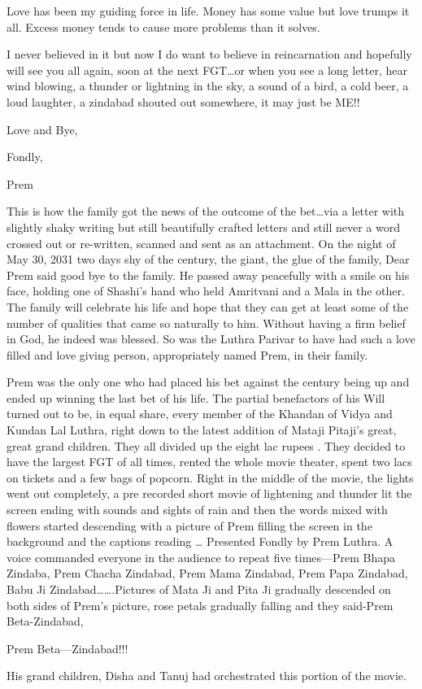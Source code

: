 Love has been my guiding force in life. Money has some value but love
trumps it all. Excess money tends to cause more problems than it solves.

I never believed in it but now I do want to believe in reincarnation and
hopefully will see you all again, soon at the next FGT\ldots{}or when
you see a long letter, hear wind blowing, a thunder or lightning in the
sky, a sound of a bird, a cold beer, a loud laughter, a zindabad shouted
out somewhere, it may just be ME!!

Love and Bye,

Fondly,

Prem

This is how the family got the news of the outcome of the bet\ldots{}via
a letter with slightly shaky writing but still beautifully crafted
letters and still never a word crossed out or re-written, scanned and
sent as an attachment. On the night of May 30, 2031 two days shy of the
century, the giant, the glue of the family, Dear Prem said good bye to
the family. He passed away peacefully with a smile on his face, holding
one of Shashi's hand who held Amritvani and a Mala in the other. The
family will celebrate his life and hope that they can get at least some
of the number of qualities that came so naturally to him. Without having
a firm belief in God, he indeed was blessed. So was the Luthra Parivar
to have had such a love filled and love giving person, appropriately
named Prem, in their family.

Prem was the only one who had placed his bet against the century being
up and ended up winning the last bet of his life. The partial
benefactors of his Will turned out to be, in equal share, every member
of the Khandan of Vidya and Kundan Lal Luthra, right down to the latest
addition of Mataji Pitaji's great, great grand children. They all
divided up the eight lac rupees . They decided to have the largest FGT
of all times, rented the whole movie theater, spent two lacs on tickets
and a few bags of popcorn. Right in the middle of the movie, the lights
went out completely, a pre recorded short movie of lightening and
thunder lit the screen ending with sounds and sights of rain and then
the words mixed with flowers started descending with a picture of Prem
filling the screen in the background and the captions reading \ldots{}
Presented Fondly by Prem Luthra. A voice commanded everyone in the
audience to repeat five times---Prem Bhapa Zindaba, Prem Chacha
Zindabad, Prem Mama Zindabad, Prem Papa Zindabad, Babu Ji
Zindabad\ldots{}\ldots{}.Pictures of Mata Ji and Pita Ji gradually
descended on both sides of Prem's picture, rose petals gradually falling
and they said-Prem Beta-Zindabad,

Prem Beta---Zindabad!!!

His grand children, Disha and Tanuj had orchestrated this portion of the
movie.
